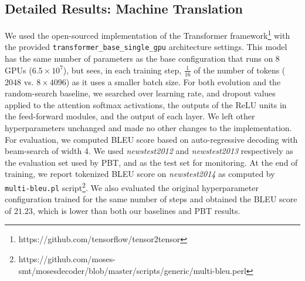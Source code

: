 \documentclass{article} %
\begin{document}
\begin{appendices}
\subsection{Detailed Results: Machine Translation}
\label{sec:mt_baseline}
We used the open-sourced implementation of the Transformer framework\footnote{https://github.com/tensorflow/tensor2tensor} with the provided \texttt{transformer\_base\_single\_gpu} architecture settings. This model has the same number of parameters as the base configuration that runs on 8 GPUs ($6.5\times10^7$), but sees, in each training step, $\frac{1}{16}$ of the number of tokens ($2048$ vs. $8 \times 4096$) as it uses a smaller batch size. For both evolution and the random-search baseline, we searched over learning rate, and dropout values applied to the attention softmax activations, the outputs of the ReLU units in the feed-forward modules, and the output of each layer. We left other hyperparameters unchanged and made no other changes to the implementation. For evaluation, we computed BLEU score based on auto-regressive decoding with beam-search of width 4. We used \textit{newstest2012} and \textit{newstest2013} respectively as the evaluation set used by PBT, and as the test set for monitoring. At the end of training, we report tokenized BLEU score on \textit{newstest2014} as computed by \texttt{multi-bleu.pl} script\footnote{https://github.com/moses-smt/mosesdecoder/blob/master/scripts/generic/multi-bleu.perl}. We also evaluated the original hyperparameter configuration trained for the same number of steps and obtained the BLEU score of $21.23$, which is lower than both our baselines and PBT results.

\end{appendices}

\end{document}
